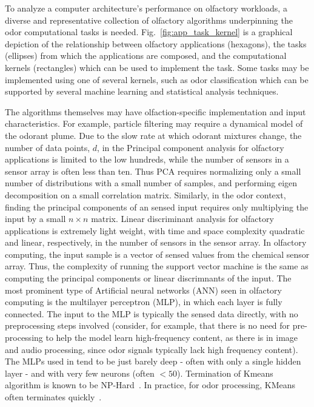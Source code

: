 % 

To analyze a computer architecture's performance on olfactory workloads, a
diverse and representative collection of olfactory algorithms underpinning the
odor computational tasks is needed.  Fig.~\ref{fig:app_task_kernel} is a graphical depiction of the relationship
between olfactory applications (hexagons), the tasks (ellipses) from which the
applications are composed, and the computational kernels (rectangles) which can
be used to implement the task.  Some tasks may be implemented using one of
several kernels, such as odor classification which can be supported by several
machine learning and statistical analysis techniques. 

The algorithms themselves may have olfaction-specific implementation and input characteristics.
For example, particle filtering may require a dynamical model of the
odorant plume.  
Due to the slow rate at which odorant mixtures change,
the number of data points, $d$, in the Principal component analysis for olfactory
applications is limited to the low hundreds,
while the number of sensors in a sensor array is often less than ten.
Thus PCA requires normalizing only a small number of distributions with
a small number of samples, and performing eigen decomposition on a small
correlation matrix.  Similarly, in the odor context, finding the
principal components of an sensed input requires only multiplying the input
by a small $n\times n$ matrix.
Linear discriminant analysis for olfactory applications is extremely light weight,
with time and space complexity quadratic  and linear, respectively,
in the number of sensors in the sensor array.
In olfactory computing, the input
sample is a vector of sensed values from the chemical sensor array. Thus, the
complexity of running the support vector machine is the same as computing the
principal components or linear discrimnants of the input.  
The most prominent type of Artificial neural networks (ANN) seen in olfactory computing is the multilayer
perceptron (MLP), in which each layer is fully connected. The input to the
MLP is typically the sensed data directly, with no preprocessing steps
involved (consider, for example, that there is no need for pre-processing
to help the model learn high-frequency content, as there is in image and audio
processing, since odor signals typically lack high frequency content).
The MLPs used in \olfc{} tend to be just barely deep - often with
only a single hidden layer - and with very few neurons (often $< 50$).
Termination of Kmeans algorithm is known to be NP-Hard~\cite{aloise2009np}.  In practice,
for odor processing, KMeans often terminates quickly~\cite{yang2018human,
zheng2019wearable}.

